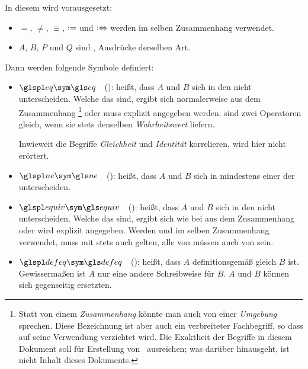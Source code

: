 In diesem \sectionname{} wird vorausgesetzt:
\begin{itemize}
	
	\item {$=$}, $\ne$, $\equiv$, $:=$ und $:\Leftrightarrow$%
	werden im selben Zusammenhang verwendet.
	
	\item $A$, $B$, $P$ und $Q$ sind ,
	\textdh Ausdrücke derselben Art.
	
\end{itemize}
Dann werden folgende Symbole definiert:
\begin{itemize}
	
	\item $\glsSym{eq}$~~(\emph{}):
	 heißt, dass $A$ und $B$ sich in den  nicht unterscheiden.
	Welche das sind, ergibt sich normalerweise aus dem Zusammenhang%
	\footnote{%
		Statt von einem \emph{Zusammenhang} könnte man auch von einer \emph{Umgebung} sprechen.
		Diese Bezeichnung ist aber auch ein verbreiteter Fachbegriff, so dass auf seine Verwendung verzichtet wird.
		Die Exaktheit der Begriffe in diesem Dokument soll für Erstellung von \ASBA\ ausreichen; was darüber hinausgeht, ist nicht Inhalt dieses Dokuments.%
	}
	oder muss explizit angegeben werden.
	\textZB sind zwei Operatoren gleich, wenn sie stets denselben \emph{\gls{Wahrheitswert}} liefern.
	
	Inwieweit die Begriffe \emph{Gleichheit} und \emph{Identität} korrelieren, wird hier nicht erörtert.
	\seename~\cite{bib:Identitaet}
	
	\item $\glsSym{ne}$~~(\emph{}):
	 heißt, dass $A$ und $B$ sich in mindestens einer der  unterscheiden.
	
	\item $\glsSym{equiv}$~~(\emph{}):
	 heißt, dass $A$ und $B$ sich in den  nicht unterscheiden.
	Welche das sind, ergibt sich wie bei \symqt{$=$} aus dem Zusammenhang oder wird explizit angegeben.
	Werden \symqt{$=$} und \symqt{$\equiv$} im selben Zusammenhang verwendet, muss mit  stets auch  gelten, \textdh alle  von \symqt{$\equiv$} müssen auch  von  sein.
	
	\item $\glsSym{defeq}$~~(\emph{}):
	 heißt, dass $A$ definitionsgemäß gleich $B$ ist.
	Gewissermaßen ist $A$ nur eine andere Schreibweise für $B$.
	$A$ und $B$ können sich gegenseitig ersetzten.
	

\end{itemize}
